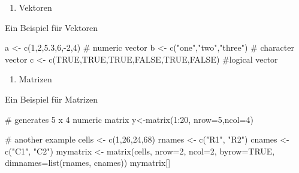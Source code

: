 \documentclass[]{article}
\newenvironment{Shaded}{\begin{snugshade}}{\end{snugshade}}
\newcommand{\KeywordTok}[1]{\textcolor[rgb]{0.94,0.87,0.69}{{#1}}}
\newcommand{\DataTypeTok}[1]{\textcolor[rgb]{0.87,0.87,0.75}{{#1}}}
\newcommand{\DecValTok}[1]{\textcolor[rgb]{0.86,0.86,0.80}{{#1}}}
\newcommand{\FloatTok}[1]{\textcolor[rgb]{0.75,0.75,0.82}{{#1}}}
\newcommand{\StringTok}[1]{\textcolor[rgb]{0.80,0.58,0.58}{{#1}}}
\newcommand{\CommentTok}[1]{\textcolor[rgb]{0.50,0.62,0.50}{{#1}}}
\newcommand{\OtherTok}[1]{\textcolor[rgb]{0.94,0.94,0.56}{{#1}}}
\newcommand{\NormalTok}[1]{\textcolor[rgb]{0.80,0.80,0.80}{{#1}}}
\begin{document}
\begin{enumerate}
\def\labelenumi{\arabic{enumi}.}
\itemsep1pt\parskip0pt
\item
  Vektoren
\end{enumerate}

Ein Beispiel für Vektoren

\begin{Shaded}
\begin{Highlighting}[]
\NormalTok{a <-}\StringTok{ }\KeywordTok{c}\NormalTok{(}\DecValTok{1}\NormalTok{,}\DecValTok{2}\NormalTok{,}\FloatTok{5.3}\NormalTok{,}\DecValTok{6}\NormalTok{,-}\DecValTok{2}\NormalTok{,}\DecValTok{4}\NormalTok{) }\CommentTok{# numeric vector}
\NormalTok{b <-}\StringTok{ }\KeywordTok{c}\NormalTok{(}\StringTok{"one"}\NormalTok{,}\StringTok{"two"}\NormalTok{,}\StringTok{"three"}\NormalTok{) }\CommentTok{# character vector}
\NormalTok{c <-}\StringTok{ }\KeywordTok{c}\NormalTok{(}\OtherTok{TRUE}\NormalTok{,}\OtherTok{TRUE}\NormalTok{,}\OtherTok{TRUE}\NormalTok{,}\OtherTok{FALSE}\NormalTok{,}\OtherTok{TRUE}\NormalTok{,}\OtherTok{FALSE}\NormalTok{) }\CommentTok{#logical vector}
\end{Highlighting}
\end{Shaded}

\begin{enumerate}
\def\labelenumi{\arabic{enumi}.}
\setcounter{enumi}{1}
\itemsep1pt\parskip0pt
\item
  Matrizen
\end{enumerate}

Ein Beispiel für Matrizen

\begin{Shaded}
\begin{Highlighting}[]
\CommentTok{# generates 5 x 4 numeric matrix }
\NormalTok{y<-}\KeywordTok{matrix}\NormalTok{(}\DecValTok{1}\NormalTok{:}\DecValTok{20}\NormalTok{, }\DataTypeTok{nrow=}\DecValTok{5}\NormalTok{,}\DataTypeTok{ncol=}\DecValTok{4}\NormalTok{)}

\CommentTok{# another example}
\NormalTok{cells <-}\StringTok{ }\KeywordTok{c}\NormalTok{(}\DecValTok{1}\NormalTok{,}\DecValTok{26}\NormalTok{,}\DecValTok{24}\NormalTok{,}\DecValTok{68}\NormalTok{)}
\NormalTok{rnames <-}\StringTok{ }\KeywordTok{c}\NormalTok{(}\StringTok{"R1"}\NormalTok{, }\StringTok{"R2"}\NormalTok{)}
\NormalTok{cnames <-}\StringTok{ }\KeywordTok{c}\NormalTok{(}\StringTok{"C1"}\NormalTok{, }\StringTok{"C2"}\NormalTok{) }
\NormalTok{mymatrix <-}\StringTok{ }\KeywordTok{matrix}\NormalTok{(cells, }\DataTypeTok{nrow=}\DecValTok{2}\NormalTok{, }\DataTypeTok{ncol=}\DecValTok{2}\NormalTok{, }\DataTypeTok{byrow=}\OtherTok{TRUE}\NormalTok{,}
  \DataTypeTok{dimnames=}\KeywordTok{list}\NormalTok{(rnames, cnames))}
\NormalTok{mymatrix[]}
\end{Highlighting}
\end{Shaded}
\end{document}
